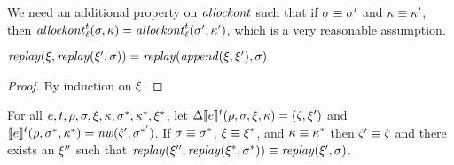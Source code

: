 \documentclass{llncs}
\begin{document}
We need an additional property on $\mathit{allockont}$ such that if $\sigma
\equiv \sigma'$ and $\kappa \equiv \kappa'$, then
$\mathit{allockont}^{t}_{\ell}(\sigma,\kappa) =
\mathit{allockont}^{t}_{\ell}(\sigma',\kappa')$, which is a very reasonable
assumption.

\begin{lemma}\label{lemma:replay-append}
$\mathit{replay}(\xi,\mathit{replay}(\xi',\sigma)) =
 \mathit{replay}(\mathit{append}(\xi,\xi'),\sigma)$
\end{lemma}
\begin{proof}
By induction on $\xi$.
\end{proof}

\begin{lemma}\label{lemma:compile-coherence}
For all $e, {t},\rho,\sigma,\xi,\kappa,\sigma^*,\kappa^*,\xi^*$,
let $\Delta\llbracket e\rrbracket^{t}(\rho,\sigma,\xi,\kappa) = (\hat{\varsigma}, \xi')$
and $\llbracket e\rrbracket^{t}(\rho,\sigma^*,\kappa^*) = \mathit{nw}(\hat{\varsigma}',\sigma^{*'})$.
If $\sigma \equiv \sigma^*$, $\xi \equiv \xi^*$, and $\kappa \equiv \kappa^*$ then
$\hat{\varsigma}' \equiv \hat{\varsigma}$
and there exists an $\xi''$ such that
   $\mathit{replay}(\xi'',\mathit{replay}(\xi^*,\sigma^*)) \equiv \mathit{replay}(\xi',\sigma)$.
\end{lemma}
\end{document}
